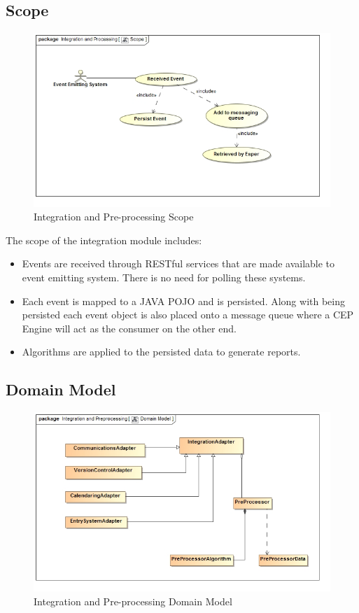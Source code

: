 \documentclass[11pt,a4paper]{article}
\begin{document}
\subsection{Scope}
\begin{figure}[H]
	\begin{center}
		\includegraphics[scale=0.6]{../Images/Integration_Scope.jpg}
		\caption{Integration and Pre-processing Scope}
	\end{center}
\end{figure}
The scope of the integration module includes:
\begin{itemize}
	\item Events are received through RESTful services that are made available to event emitting system. There is no need for polling these systems.
	\item Each event is mapped to a JAVA POJO and is persisted. Along with being persisted each event object is also placed onto a message queue where a CEP Engine will act as the consumer on the other end.
	\item Algorithms are applied to the persisted data to generate reports.
\end{itemize}

\subsection{Domain Model}
\begin{figure}[H]
	\begin{center}
		\includegraphics[scale=0.75]{../Images/Integration_Domain.jpg}
		\caption{Integration and Pre-processing Domain Model}
	\end{center}
\end{figure}
\end{document}
